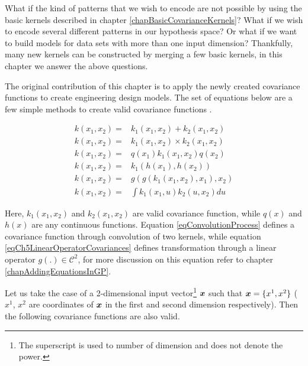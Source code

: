 What if the kind of patterns that we wish to encode are not possible by using the basic kernels described in chapter \ref{chapBasicCovarianceKernels}? What if we wish to encode several different patterns in our hypothesis space? Or what if we want to build models for data sets with more than one input dimension? Thankfully, many new kernels can be constructed by merging a few basic kernels, in this chapter we answer the above questions. 

The original contribution of this chapter is to apply the newly created covariance functions to create engineering design models. The set of equations below are a few simple methods to create valid covariance functions \cite{bishop2006pattern, mackay2003information, durrande2001etude, durrande2013anova}. 

\begin{align}
k(x_{1}, x_{2}) =  & k_{1}(x_{1}, x_{2}) + k_{2}(x_{1}, x_{2})  \label{eqCh5AddingCovariances} \\
k(x_{1}, x_{2}) =  & k_{1}(x_{1}, x_{2}) \times k_{2}(x_{1}, x_{2}) \label{eqCh5MultiplyingCovariances} \\
k(x_{1}, x_{2}) =  & q(x_{1})k_{1}(x_{1}, x_{2})q(x_{2}) \label{eqCh5MultiplyingWithFunction} \\
k(x_{1}, x_{2}) =  & k_{1}(h(x_{1}), h(x_{2})) \label{eqCh5ComposedCovariances} \\
k(x_{1}, x_{2}) =  & g(g(k_{1}(x_{1}, x_{2}), x_{1}), x_{2} ) \label{eqCh5LinearOperatorCovariances} \\
k(x_{1}, x_{2}) = & \int k_{1}(x_{1}, u)k_{2}(u, x_{2})du \label{eqConvolutionProcess}
\end{align}


Here, $k_{1}(x_{1}, x_{2})$ and $k_{2}(x_{1}, x_{2})$ are valid covariance function, while $q(x)$ and $h(x)$ are any continuous functions. Equation \ref{eqConvolutionProcess} defines a covariance function through convolution of two kernels, while equation \ref{eqCh5LinearOperatorCovariances} defines transformation through a linear operator $g\left ( . \right ) \in \mathcal{C}^{2}$, for more discussion on this equation refer to chapter \ref{chapAddingEquationsInGP}. 

Let us take the case of a 2-dimensional input vector\footnote{The superscript is used to number of dimension and does not denote the power.} $\boldsymbol{x}$ such that $\boldsymbol{x} = \{x^{1}, x^{2}\}$ ($x^{1}$, $x^{2}$ are coordinates of $\boldsymbol{x}$ in the first and second dimension respectively). Then the following covariance functions are also valid.

